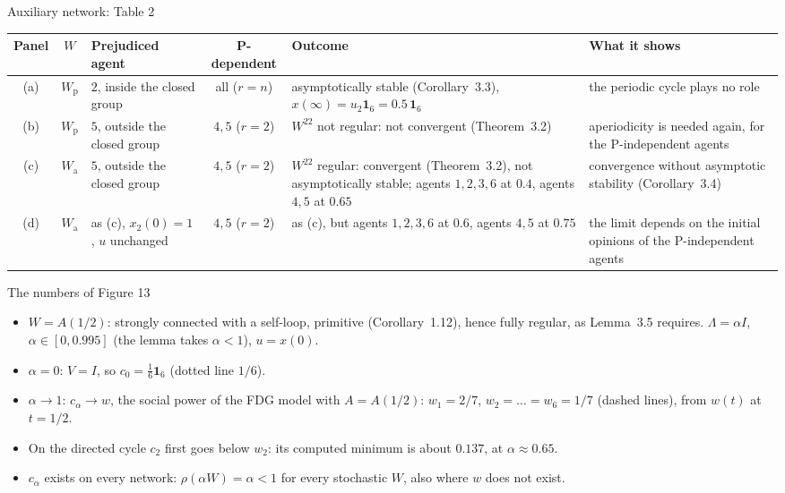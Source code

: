 \begin{frame}[label=bk-aux-table]{Auxiliary network: Table 2}
  \centering
  \scriptsize
  \renewcommand{\arraystretch}{1.25}
  \begin{tabular}{@{}c c >{\raggedright\arraybackslash}p{2.3cm} c >{\raggedright\arraybackslash}p{4.2cm} >{\raggedright\arraybackslash}p{3.6cm}@{}}
    \toprule
    Panel & $W$ & Prejudiced agent & P-dependent & Outcome & What it shows \\
    \midrule
    (a) & $W_{\mathrm{p}}$ & $2$, inside the closed group & all ($r = n$)
        & asymptotically stable (Corollary~3.3),
          $x(\infty) = u_2 \mathbf{1}_6 = 0.5\, \mathbf{1}_6$
        & the periodic cycle plays no role \\
    \midrule
    (b) & $W_{\mathrm{p}}$ & $5$, outside the closed group & $4, 5$ ($r = 2$)
        & $W^{22}$ not regular: not convergent (Theorem~3.2)
        & aperiodicity is needed again, for the P-independent agents \\
    \midrule
    (c) & $W_{\mathrm{a}}$ & $5$, outside the closed group & $4, 5$ ($r = 2$)
        & $W^{22}$ regular: convergent (Theorem~3.2), not asymptotically stable; agents
          $1,2,3,6$ at $0.4$, agents $4,5$ at $0.65$
        & convergence without asymptotic stability (Corollary~3.4) \\
    \midrule
    (d) & $W_{\mathrm{a}}$ & as (c), $x_2(0) = 1$, $u$ unchanged & $4, 5$ ($r = 2$)
        & as (c), but agents $1,2,3,6$ at $0.6$, agents $4,5$ at $0.75$
        & the limit depends on the initial opinions of the P-independent agents \\
    \bottomrule
  \end{tabular}
\end{frame}

\begin{frame}[label=bk-lemma-numbers]{The numbers of Figure 13}
  \small
  \begin{itemize}
    \item $W = A(1/2)$: strongly connected with a self-loop, primitive (Corollary~1.12),
          hence fully regular, as Lemma~3.5 requires. $\Lambda = \alpha I$,
          $\alpha \in [0, 0.995]$ (the lemma takes $\alpha < 1$), $u = x(0)$.
    \item $\alpha = 0$: $V = I$, so $c_0 = \frac16 \mathbf{1}_6$ (dotted line $1/6$).
    \item $\alpha \to 1$: $c_\alpha \to w$, the social power of the FDG model with
          $A = A(1/2)$: $w_1 = 2/7$, $w_2 = \dots = w_6 = 1/7$ (dashed lines), from
          $w(t)$ at $t = 1/2$.
    \item On the directed cycle $c_2$ first goes below $w_2$: its computed minimum is about
          $0.137$, at $\alpha \approx 0.65$.
    \item $c_\alpha$ exists on every network: $\rho(\alpha W) = \alpha < 1$ for every
          stochastic $W$, also where $w$ does not exist.
  \end{itemize}
\end{frame}

